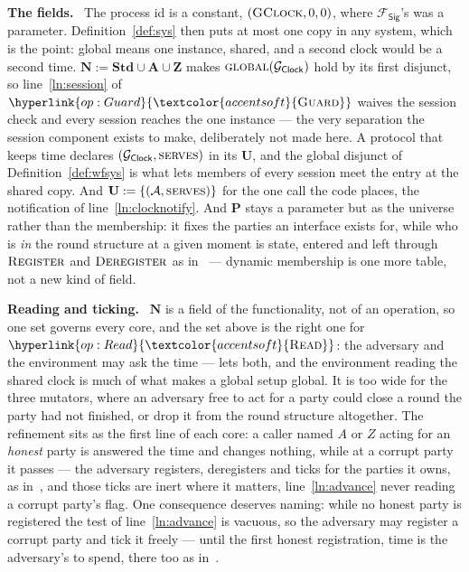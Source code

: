 \documentclass[10pt,oneside,openany]{book}
\newcommand{\Ps}{\mathbf{P}}
\newcommand{\admits}{\mathbf{N}}
\newcommand{\Apid}{\mathbf{A}}
\newcommand{\Zpid}{\mathbf{Z}}
\newcommand{\Stdpid}{\mathbf{Std}}
\newcommand{\uses}{\mathbf{U}}
\newcommand{\serves}{\op{serves}}
\newcommand{\Adv}{\mathcal{A}}
\newcommand{\op}[1]{\textnormal{\textsc{#1}}}
\newcommand{\opl}[1]{\hyperlink{op:#1}{\textcolor{accentsoft}{\op{#1}}}}
\newcommand{\Fsig}{\mathcal{F}_{\mathsf{Sig}}}
\newcommand{\Gclock}{\mathcal{G}_{\mathsf{Clock}}}
\newcommand{\heading}[1]{\medskip\par\noindent\textcolor{accent}{\textbf{#1.}}\ }
\theoremstyle{accentdef}
\theoremstyle{accentplain}
\begin{document}
\heading{The fields} The process id is a constant, $(\op{G}\op{Clock},0,0)$, where
$\Fsig$'s was a parameter. Definition~\ref{def:sys} then puts at most one copy in any system,
which is the point: global means one instance, shared, and a second clock would be a second time.
$\admits := \Stdpid \cup \Apid \cup \Zpid$ makes $\op{global}(\Gclock)$ hold by its first disjunct,
so line~\ref{ln:session} of $\opl{Guard}$ waives the session check and every session reaches the
one instance --- the very separation the session component exists to make, deliberately not made
here. A protocol that keeps time declares $(\Gclock,\serves)$ in its $\uses$, and the global
disjunct of Definition~\ref{def:wfsys} is what lets members of every session meet the entry at
the shared copy. And $\uses := \{(\Adv,\serves)\}$ for the one call the code places, the notification
of line~\ref{ln:clocknotify}. And $\Ps$ stays a parameter but as the universe rather than the
membership: it fixes the parties an interface exists for, while who is \emph{in} the round
structure at a given moment is state, entered and left through $\op{Register}$ and
$\op{Deregister}$ as in~\cite{BMTZ17} --- dynamic membership is one more table, not a new kind
of field.

\heading{Reading and ticking} $\admits$ is a field of the functionality, not of an operation, so
one set governs every core, and the set above is the right one for $\opl{Read}$: the adversary and
the environment may ask the time --- \cite{BMTZ17} lets both, and the environment reading the
shared clock is much of what makes a global setup global. It is too wide for the three mutators,
where an adversary free to act for a party could close a round the party had not finished, or
drop it from the round structure altogether. The refinement sits as the first line of each core:
a caller named $A$ or $Z$ acting for an \emph{honest} party is answered the time and changes
nothing, while at a corrupt party it passes --- the adversary registers, deregisters and ticks
for the parties it owns, as in~\cite{BMTZ17}, and those ticks are inert where it matters,
line~\ref{ln:advance} never reading a corrupt party's flag. One consequence deserves naming:
while no honest party is registered the test of line~\ref{ln:advance} is vacuous, so the
adversary may register a corrupt party and tick it freely --- until the first honest
registration, time is the adversary's to spend, there too as in~\cite{BMTZ17}.
\end{document}
